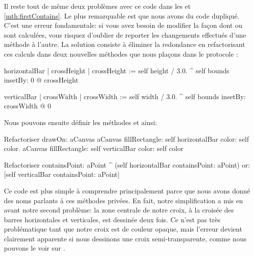 \documentclass[a4paper,10pt,twoside]{book}
\begin{document}
Il reste tout de même deux problèmes avec ce code dans les 
 et \ref{mth:firstContains}.
Le plus remarquable est que nous avons du code dupliqué.
C'est une erreur fondamentale: si vous avez besoin de modifier la
façon dont  ou  sont
calculées, vous risquez d'oublier de reporter les changements
effectués d'une méthode à l'autre.
La solution consiste à éliminer la redondance en refactorisant ces
calculs dans deux nouvelles méthodes que nous plaçons dans le
protocole :

\begin{method}{}
horizontalBar
	| crossHeight |
	crossHeight := self height / 3.0.
	^ self bounds insetBy: 0 @ crossHeight
\end{method}

\begin{method}{}
verticalBar
	| crossWidth |
	crossWidth := self width / 3.0.
	^ self bounds insetBy: crossWidth @ 0
\end{method}

\noindent
Nous pouvons ensuite définir les méthodes  et
 ainsi:

\begin{method}{Refactoriser }
drawOn: aCanvas 
	aCanvas fillRectangle: self horizontalBar color: self color.
	aCanvas fillRectangle: self verticalBar color: self color
\end{method}

\begin{method}{Refactoriser }
containsPoint: aPoint
	^ (self horizontalBar containsPoint: aPoint)
		or: [self verticalBar containsPoint: aPoint]
\end{method}

Ce code est plus simple à comprendre principalement parce que nous
avons donné des noms parlants à ces méthodes privées. En fait,
notre simplification a mis en avant notre second problème: 
la zone centrale de notre croix, à la croisée des barres
horizontales et verticales, est dessinée deux fois. Ce n'est pas
très problématique tant que notre croix est de couleur opaque,
mais l'erreur devient clairement apparente si nous dessinons une croix
semi-transparente, comme nous pouvons le voir sur .
\end{document}
